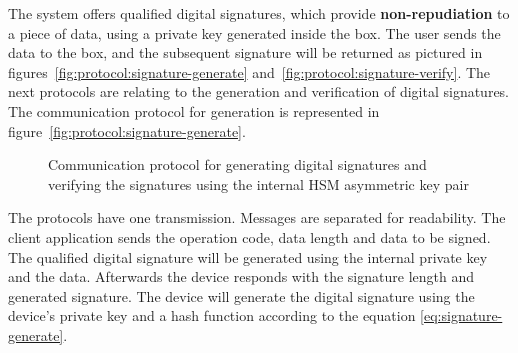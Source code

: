 The system offers qualified digital signatures, which provide \textbf{non-repudiation} to a piece of data, using a private key generated inside the box. The user sends the data to the box, and the subsequent signature will be returned as pictured in figures~\ref{fig:protocol:signature-generate} and~\ref{fig:protocol:signature-verify}.
The next protocols are relating to the generation and verification of digital signatures.
The communication protocol for generation is represented in figure~\ref{fig:protocol:signature-generate}.

\begin{figure}[h!]
	\centering     %
	\caption{Communication protocol for generating digital signatures and verifying the signatures using the internal HSM asymmetric key pair}
\end{figure}

The protocols have one transmission. Messages are separated for readability.
The client application sends the operation code, data length and data to be signed.
The qualified digital signature will be generated using the internal private key and the data. Afterwards the device responds with the signature length and generated signature.
The device will generate the digital signature using the device's private key and a hash function according to the equation \ref{eq:signature-generate}.

